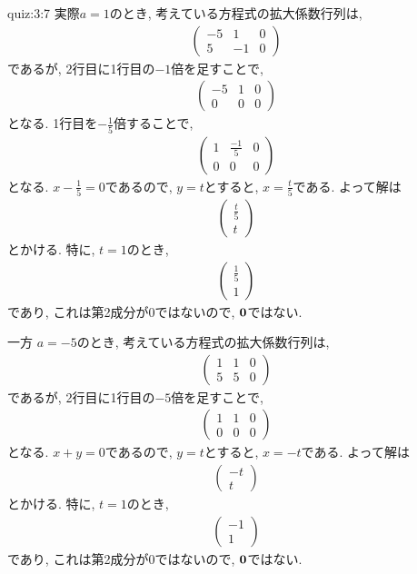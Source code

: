 \begin{answerof}{quiz:3:7}
  実際$a=1$のとき,
  考えている方程式の拡大係数行列は,
  \begin{align*}
    \begin{pmatrix}-5&1&0\\5&-1&0\end{pmatrix}
  \end{align*}
  であるが, 2行目に1行目の$-1$倍を足すことで,
  \begin{align*}
    \begin{pmatrix}-5&1&0\\0&0&0\end{pmatrix}
  \end{align*}
  となる. 1行目を$-\frac{1}{5}$倍することで,
  \begin{align*}
    \begin{pmatrix}1&\frac{-1}{5}&0\\0&0&0\end{pmatrix}
  \end{align*}
  となる.  $x-\frac{1}{5}=0$であるので, $y=t$とすると, $x=\frac{t}{5}$である.
  よって解は
  \begin{align*}
    \begin{pmatrix}\frac{t}{5}\\t\end{pmatrix}
  \end{align*}
  とかける. 特に, $t=1$のとき,
  \begin{align*}
    \begin{pmatrix}\frac{1}{5}\\1\end{pmatrix}
  \end{align*}
  であり, これは第2成分が$0$ではないので, $\boldsymbol{0}$ではない.

  一方
  $a=-5$のとき,
  考えている方程式の拡大係数行列は,
  \begin{align*}
    \begin{pmatrix}1&1&0\\5&5&0\end{pmatrix}
  \end{align*}
  であるが, 2行目に1行目の$-5$倍を足すことで,
  \begin{align*}
    \begin{pmatrix}1&1&0\\0&0&0\end{pmatrix}
  \end{align*}
  となる.
  $x+y=0$であるので, $y=t$とすると, $x=-t$である.
  よって解は
  \begin{align*}
    \begin{pmatrix}-t\\t\end{pmatrix}
  \end{align*}
  とかける. 特に, $t=1$のとき,
  \begin{align*}
    \begin{pmatrix}-1\\1\end{pmatrix}
  \end{align*}
  であり, これは第2成分が$0$ではないので, $\boldsymbol{0}$ではない.  
\end{answerof}
